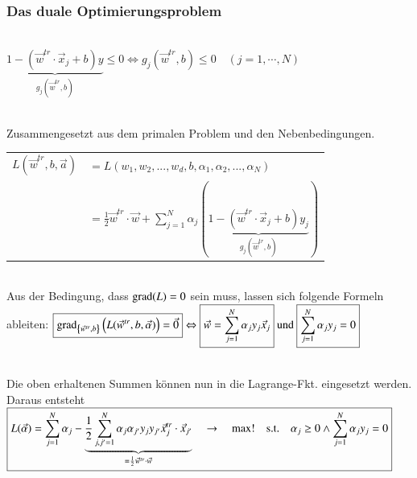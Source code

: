 \subsubsection{Das duale Optimierungsproblem}
\\
$\boxed{\underbrace{1-\left(\vec{w}^{tr}\cdot\vec{x}_j+b\right)y}_{g_j(\vec{w}^{tr},b)}\leq0\Leftrightarrow g_j(\vec{w}^{tr},b)\leq0\quad\left(j=1,\cdots,N\right)}$
\medskip

\\
Zusammengesetzt aus dem primalen Problem und den Nebenbedingungen.\\
\begin{tabular}{|r@{ }l|}
    \hline
    $L(\vec{w}^{tr},b,\vec{a})$ & $ =L(w_1,w_2, ...,w_d,b,\alpha_1,\alpha_2, ...,\alpha_N) $ \\
                                & $ =\frac12\vec{w}^{tr}\cdot\vec{w}+\sum_{j=1}^N\alpha_j\left(\underbrace{1-\left(\vec{w}^{tr}\cdot\vec{x}_j+b\right)y_j}_{g_j\left(\vec{w}^{tr},b\right)}\right) $ \\
    \hline
\end{tabular}
\medskip

\\
Aus der Bedingung, dass $\operatorname{grad}(L) = 0$ sein muss, lassen sich folgende Formeln ableiten:
$\boxed{\operatorname{grad}_{\left\{\vec{w}^{tr},b\right\}}\left(L(\vec{w}^{tr},b,\vec{\alpha})\right)=\vec{0}} \Leftrightarrow 
\boxed{\vec{w}=\sum_{j=1}^N\alpha_jy_j\vec{x}_j} \text{ und }
\boxed{\sum_{j=1}^N\alpha_jy_j=0}$

\\
Die oben erhaltenen Summen können nun in die Lagrange-Fkt. eingesetzt werden. Daraus entsteht\\
$\boxed{L(\vec{\alpha})=\sum_{j=1}^N\alpha_j-\underbrace{\frac12\sum_{j,j'=1}^N\alpha_j\alpha_{j'} \space y_jy_{j'} \space \vec{x}_j^{tr}\cdot\vec{x}_{j'}}_{=\frac12 \vec{w}^{tr} \cdot \vec{w}}\quad\to\quad\max!\quad\mathrm{s.t.}\quad\alpha_j\geq0\wedge\sum_{j=1}^N\alpha_jy_j=0}$



